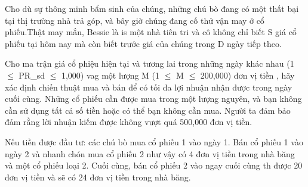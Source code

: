 Cho dù sự thông minh bẩm sinh của chúng, những chú bò đang có một thất  bại tại thị trường nhà trả góp, và bây giờ chúng đang cố thử vận may ở  cổ phiếu.Thật may mắn, Bessie là is một nhà tiên tri và cô không chỉ biết  S giá cổ phiếu tại hôm nay mà còn biết trước giá của chúng trong D ngày  tiếp theo.  

   Cho ma trận giá cổ phiệu hiện tại và tương lai trong những ngày khác nhau  (1  $\le$  PR\_sd  $\le$  1,000) vag một lượng M (1  $\le$  M  $\le$  200,000) đơn vị tiền , hãy xác định chiến thuật mua và bán để có tối đa lợi nhuận nhận được trong  ngày cuối cùng. Những cổ phiếu cần được mua trong một lượng nguyên, và bạn  không cần sử dụng tất cả số tiền hoặc có thể bạn không cần mua. Người ta  đảm bảo đảm rằng lời nhuận kiếm được không vượt quá 500,000 đơn vị tiền.  

   Nếu tiền được đầu tư: các chú bò mua cổ phiếu 1 vào ngày 1. Bán cổ phiếu  1 vào ngày 2 và nhanh chón mua cổ phiếu 2 như vậy có 4 đơn vị tiền trong  nhà băng và một cổ phiếu loại 2. Cuối cùng, bán cổ phiếu 2 vào ngay cuối  cùng th được 20 đơn vị tiền và sẽ có 24 đơn vị tiền trong nhà băng.